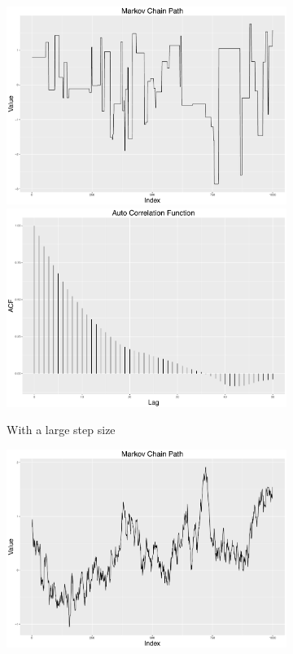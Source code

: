 \begin{figure}[h]
\centering
 \begin{subfigure}[b]{0.32\textwidth}
     \includegraphics[width=\textwidth]{Chapters/05MCMCOU/plots/gglargechain.pdf}
     \includegraphics[width=\textwidth]{Chapters/05MCMCOU/plots/gglargeacf.pdf}
     \caption{With a large step size}\label{MCMClargestep}
\end{subfigure}
\begin{subfigure}[b]{0.32\textwidth}
    \includegraphics[width=\textwidth]{Chapters/05MCMCOU/plots/ggsmallchain.pdf}

\end{subfigure}
\end{figure}
